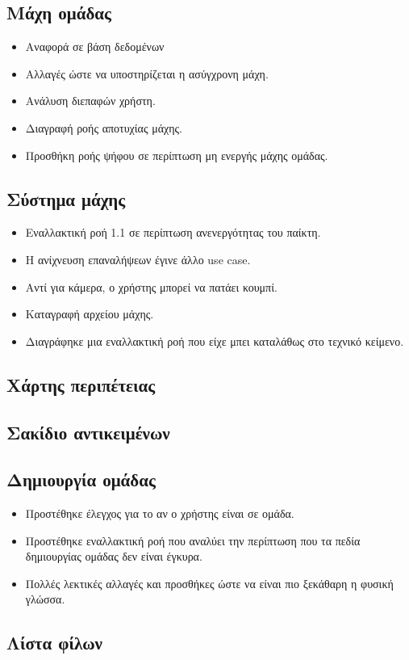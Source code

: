 \subsection{Μάχη ομάδας}
\begin{itemize}
    \item Αναφορά σε βάση δεδομένων
    \item Αλλαγές ώστε να υποστηρίζεται η ασύγχρονη μάχη.
    \item Ανάλυση διεπαφών χρήστη.
    \item Διαγραφή ροής αποτυχίας μάχης.
    \item Προσθήκη ροής ψήφου σε περίπτωση μη ενεργής μάχης ομάδας.
\end{itemize}
\subsection{Σύστημα μάχης}
\begin{itemize}
    \item Εναλλακτική ροή 1.1 σε περίπτωση ανενεργότητας του παίκτη.
	\item Η ανίχνευση επαναλήψεων έγινε άλλο use case.
	\item Αντί για κάμερα, ο χρήστης μπορεί να πατάει κουμπί.
	\item Καταγραφή αρχείου μάχης.
	\item Διαγράφηκε μια εναλλακτική ροή που είχε μπει καταλάθως στο τεχνικό κείμενο.
\end{itemize}
\subsection{Χάρτης περιπέτειας}
\subsection{Σακίδιο αντικειμένων}
\subsection{Δημιουργία ομάδας}
\begin{itemize}
    \item Προστέθηκε έλεγχος για το αν ο χρήστης είναι σε ομάδα.
    \item Προστέθηκε εναλλακτική ροή που αναλύει την περίπτωση που τα πεδία δημιουργίας ομάδας δεν είναι έγκυρα.
    \item Πολλές λεκτικές αλλαγές και προσθήκες ώστε να είναι πιο ξεκάθαρη η φυσική γλώσσα.
\end{itemize}
\subsection{Λίστα φίλων}


\clearpage